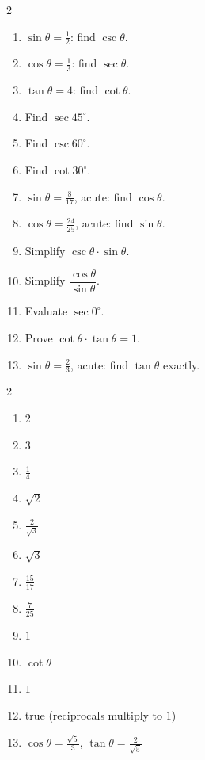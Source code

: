 \documentclass[11pt]{article}
\begin{document}
\begin{recapbox}
\begin{multicols}{2}
\small
\begin{enumerate}[leftmargin=*,itemsep=3pt]
  \item $\sin\theta=\tfrac12$: find $\csc\theta$.
  \item $\cos\theta=\tfrac13$: find $\sec\theta$.
  \item $\tan\theta=4$: find $\cot\theta$.
  \item Find $\sec45^\circ$.
  \item Find $\csc60^\circ$.
  \item Find $\cot30^\circ$.
  \item $\sin\theta=\tfrac{8}{17}$, acute: find $\cos\theta$.
  \item $\cos\theta=\tfrac{24}{25}$, acute: find $\sin\theta$.
  \item Simplify $\csc\theta\cdot\sin\theta$.
  \item Simplify $\dfrac{\cos\theta}{\sin\theta}$.
  \item Evaluate $\sec0^\circ$.
  \item Prove $\cot\theta\cdot\tan\theta=1$.
  \item $\sin\theta=\tfrac23$, acute: find $\tan\theta$ exactly.
\end{enumerate}
\end{multicols}
\end{recapbox}

\begin{keybox}
\begin{multicols}{2}
\small
\begin{enumerate}[leftmargin=*,itemsep=3pt]
  \item $2$
  \item $3$
  \item $\tfrac14$
  \item $\sqrt2$
  \item $\tfrac{2}{\sqrt3}$
  \item $\sqrt3$
  \item $\tfrac{15}{17}$
  \item $\tfrac{7}{25}$
  \item $1$
  \item $\cot\theta$
  \item $1$
  \item true (reciprocals multiply to $1$)
  \item $\cos\theta=\tfrac{\sqrt5}{3}$, $\tan\theta=\tfrac{2}{\sqrt5}$
\end{enumerate}
\end{multicols}
\end{keybox}
\end{document}
